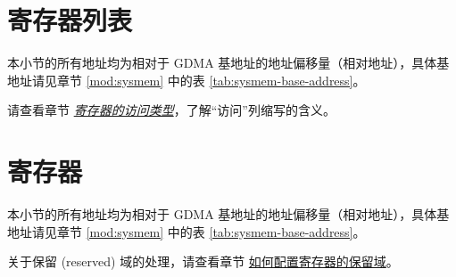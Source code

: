 \documentclass[main\_\_CN.tex]{subfiles}
\begin{document}



\newpage
\begin{landscape}
\hypertarget{dma-reg-summ}{}
\section{寄存器列表}
\label{sec:dma-reg-summ}

本小节的所有地址均为相对于 GDMA 基地址的地址偏移量（相对地址），具体基地址请见章节 \ref{mod:sysmem} \textit{} 中的表 \ref{tab:sysmem-base-address}。

请查看章节 \hyperref[glossary-access-types]{\textit{寄存器的访问类型}}，了解“访问”列缩写的含义。



\end{landscape}



\newpage
\section{寄存器}

本小节的所有地址均为相对于 GDMA 基地址的地址偏移量（相对地址），具体基地址请见章节 \ref{mod:sysmem} \textit{} 中的表 \ref{tab:sysmem-base-address}。

关于保留 (reserved) 域的处理，请查看章节 \hyperref[programming-reserved-field]{如何配置寄存器的保留域}。


\end{document}
